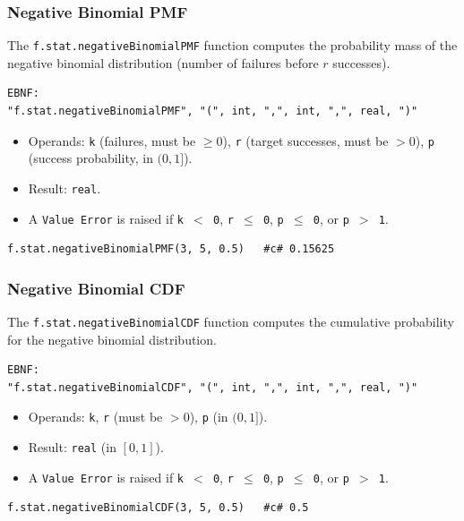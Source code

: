 \subsubsection{Negative Binomial PMF}
The \texttt{f.stat.negativeBinomialPMF} function computes the probability mass of the negative binomial distribution (number of failures before $r$ successes).
\begin{verbatim}
EBNF:
"f.stat.negativeBinomialPMF", "(", int, ",", int, ",", real, ")"
\end{verbatim}
\begin{itemize}
\item Operands: \texttt{k} (failures, must be $\geq 0$), \texttt{r} (target successes, must be $> 0$), \texttt{p} (success probability, in $(0, 1]$).
\item Result: \texttt{real}.
\item A \texttt{Value Error} is raised if \texttt{k $<$ 0}, \texttt{r $\leq$ 0}, \texttt{p $\leq$ 0}, or \texttt{p $>$ 1}.
\end{itemize}
\begin{verbatim}
f.stat.negativeBinomialPMF(3, 5, 0.5)   #c# 0.15625
\end{verbatim}

\subsubsection{Negative Binomial CDF}
The \texttt{f.stat.negativeBinomialCDF} function computes the cumulative probability for the negative binomial distribution.
\begin{verbatim}
EBNF:
"f.stat.negativeBinomialCDF", "(", int, ",", int, ",", real, ")"
\end{verbatim}
\begin{itemize}
\item Operands: \texttt{k}, \texttt{r} (must be $> 0$), \texttt{p} (in $(0, 1]$).
\item Result: \texttt{real} (in $[0, 1]$).
\item A \texttt{Value Error} is raised if \texttt{k $<$ 0}, \texttt{r $\leq$ 0}, \texttt{p $\leq$ 0}, or \texttt{p $>$ 1}.
\end{itemize}
\begin{verbatim}
f.stat.negativeBinomialCDF(3, 5, 0.5)   #c# 0.5
\end{verbatim}

